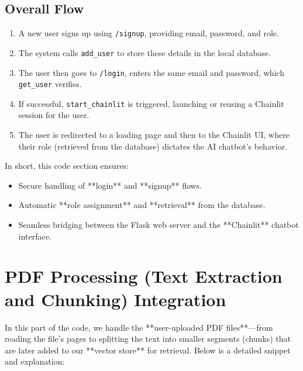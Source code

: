 \subsection{Overall Flow}
\begin{enumerate}
  \item A new user signs up using \texttt{/signup}, providing email, password, and role.
  \item The system calls \texttt{add\_user} to store these details in the local database.
  \item The user then goes to \texttt{/login}, enters the same email and password, which \texttt{get\_user} verifies.
  \item If successful, \texttt{start\_chainlit} is triggered, launching or reusing a Chainlit session for the user.
  \item The user is redirected to a loading page and then to the Chainlit UI, where their role (retrieved from the database) 
        dictates the AI chatbot’s behavior.
\end{enumerate}

\noindent
In short, this code section ensures:
\begin{itemize}
    \item Secure handling of **login** and **signup** flows.
    \item Automatic **role assignment** and **retrieval** from the database.
    \item Seamless bridging between the Flask web server and the **Chainlit** chatbot interface.
\end{itemize}

\section{PDF Processing (Text Extraction and Chunking) Integration}
\label{sec:pdf-chunking}

In this part of the code, we handle the **user-uploaded PDF files**—from reading the file’s pages to splitting the text into smaller segments (chunks) that are later added to our **vector store** for retrieval. Below is a detailed snippet and explanation:

